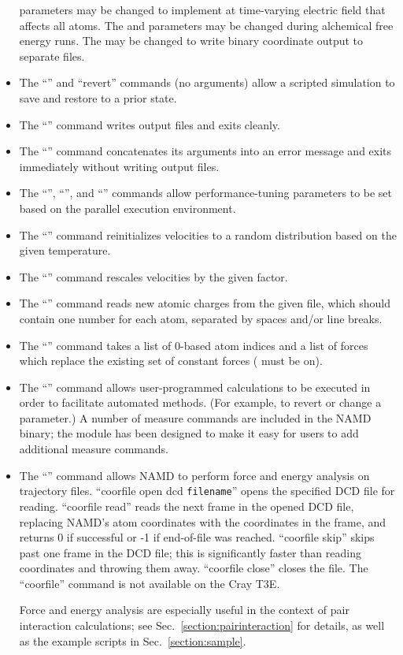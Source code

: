 \begin{itemize}
     parameters may be changed to implement
    at time-varying electric field that affects all atoms.
    The  and 
    parameters may be changed during alchemical free energy runs.
    The  may be changed to write binary coordinate
    output to separate files.
 \item The ``'' and ``revert'' commands (no arguments) allow
    a scripted simulation to save and restore to a prior state.
 \item The ``'' command writes output files and exits cleanly.
 \item The ``'' command concatenates its arguments into
    an error message and exits immediately without writing output files.
 \item The ``'', ``'', and
    ``'' commands allow performance-tuning
    parameters to be set based on the parallel execution environment.
 \item The ``'' command reinitializes velocities to a
    random distribution based on the given temperature.
 \item The ``'' command rescales velocities by
    the given factor.
 \item The ``'' command reads new atomic charges from
    the given file, which should contain one number for each atom, separated
    by spaces and/or line breaks.
 \item The ``'' command takes a list of
    0-based atom indices and a list of forces which replace the existing
    set of constant forces ( must be on).
 \item The ``'' command allows user-programmed calculations to
    be executed in order to facilitate automated methods.  (For
    example, to revert or change a parameter.)  A number of measure
    commands are included in the NAMD binary; the module has been designed
    to make it easy for users to add additional measure commands.  
 \item The ``'' command allows NAMD to perform force and energy
    analysis on trajectory files.  ``coorfile open dcd {\tt filename}'' opens
    the specified DCD file for reading.  ``coorfile read'' reads the next
    frame in the opened DCD file, replacing NAMD's atom coordinates with the
    coordinates in the frame, and returns 0 if successful or -1 if  
    end-of-file was reached.  ``coorfile skip'' skips past one frame in the
    DCD file; this is significantly faster than reading coordinates and 
    throwing them away.  ``coorfile close'' closes the file.   
    The ``coorfile'' command is not available on the Cray T3E.

    Force and energy analysis are especially useful in the context of 
    pair interaction calculations; see Sec.~\ref{section:pairinteraction}
    for details, as well as the example scripts in Sec.~\ref{section:sample}.
\end{itemize}

